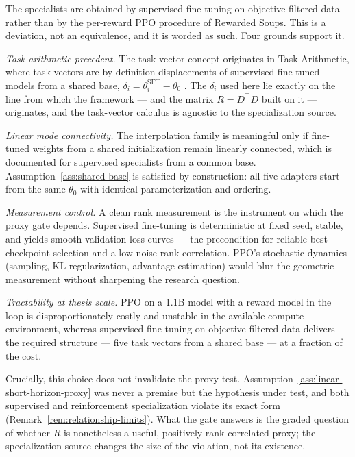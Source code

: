 \documentclass[12pt,a4paper]{report}
\newcommand{\1}{\mathbf{1}}
\theoremstyle{definition}
\begin{document}
The specialists are obtained by supervised fine-tuning on objective-filtered data rather than by the per-reward PPO procedure of Rewarded Soups. This is a deviation, not an equivalence, and it is worded as such. Four grounds support it.

\emph{Task-arithmetic precedent.} The task-vector concept originates in Task Arithmetic, where task vectors are by definition displacements of supervised fine-tuned models from a shared base, \(\delta_i=\theta_i^{\mathrm{SFT}}-\theta_0\) \citep{ilharco2022taskarithmetic}. The \(\delta_i\) used here lie exactly on the line from which the framework --- and the matrix \(R=D^\top D\) built on it --- originates, and the task-vector calculus is agnostic to the specialization source.

\emph{Linear mode connectivity.} The interpolation family is meaningful only if fine-tuned weights from a shared initialization remain linearly connected, which is documented for supervised specialists from a common base. Assumption~\ref{ass:shared-base} is satisfied by construction: all five adapters start from the same \(\theta_0\) with identical parameterization and ordering.

\emph{Measurement control.} A clean rank measurement is the instrument on which the proxy gate depends. Supervised fine-tuning is deterministic at fixed seed, stable, and yields smooth validation-loss curves --- the precondition for reliable best-checkpoint selection and a low-noise rank correlation. PPO's stochastic dynamics (sampling, KL regularization, advantage estimation) would blur the geometric measurement without sharpening the research question.

\emph{Tractability at thesis scale.} PPO on a 1.1B model with a reward model in the loop is disproportionately costly and unstable in the available compute environment, whereas supervised fine-tuning on objective-filtered data delivers the required structure --- five task vectors from a shared base --- at a fraction of the cost.

Crucially, this choice does not invalidate the proxy test. Assumption~\ref{ass:linear-short-horizon-proxy} was never a premise but the hypothesis under test, and both supervised and reinforcement specialization violate its exact form (Remark~\ref{rem:relationship-limits}). What the gate answers is the graded question of whether \(R\) is nonetheless a useful, positively rank-correlated proxy; the specialization source changes the size of the violation, not its existence.
\end{document}
